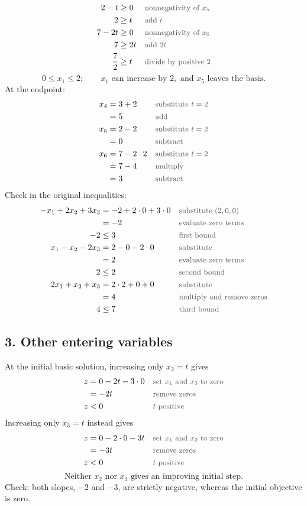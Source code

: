 \documentclass[a4paper,11pt]{article}
\newif\ifexplain
\newcommand{\teil}[1]{\subsection*{#1}}
\newcommand{\why}[1]{\text{\small\color{black!65}#1}}
\newcommand{\explain}[1]{\ifexplain\begin{erklbox}#1\end{erklbox}\fi}
\begin{document}
\begin{align*}
2-t&\geq0&&\why{nonnegativity of $x_5$}\\
2&\geq t&&\why{add $t$}\\
7-2t&\geq0&&\why{nonnegativity of $x_6$}\\
7&\geq2t&&\why{add $2t$}\\
\frac72&\geq t&&\why{divide by positive $2$}
\end{align*}
\[\boxed{0\leq x_1\leq2;\qquad x_1\text{ can increase by }2,\text{ and }x_5\text{ leaves the basis}.}\]
At the endpoint:
\begin{align*}
x_4&=3+2&&\why{substitute $t=2$}\\
&=5&&\why{add}\\
x_5&=2-2&&\why{substitute $t=2$}\\
&=0&&\why{subtract}\\
x_6&=7-2\cdot2&&\why{substitute $t=2$}\\
&=7-4&&\why{multiply}\\
&=3&&\why{subtract}
\end{align*}
Check in the original inequalities:
\begin{align*}
-x_1+2x_2+3x_3&=-2+2\cdot0+3\cdot0&&\why{substitute $(2,0,0)$}\\
&=-2&&\why{evaluate zero terms}\\
-2&\leq3&&\why{first bound}\\
x_1-x_2-2x_3&=2-0-2\cdot0&&\why{substitute}\\
&=2&&\why{evaluate zero terms}\\
2&\leq2&&\why{second bound}\\
2x_1+x_2+x_3&=2\cdot2+0+0&&\why{substitute}\\
&=4&&\why{multiply and remove zeros}\\
4&\leq7&&\why{third bound}
\end{align*}

\teil{3. Other entering variables}
At the initial basic solution, increasing only $x_2=t$ gives
\begin{align*}
z&=0-2t-3\cdot0&&\why{set $x_1$ and $x_3$ to zero}\\
&=-2t&&\why{remove zeros}\\
z&<0&&\why{$t$ positive}
\end{align*}
Increasing only $x_3=t$ instead gives
\begin{align*}
z&=0-2\cdot0-3t&&\why{set $x_1$ and $x_2$ to zero}\\
&=-3t&&\why{remove zeros}\\
z&<0&&\why{$t$ positive}
\end{align*}
\[\boxed{\text{Neither }x_2\text{ nor }x_3\text{ gives an improving initial step}.}\]
Check: both slopes, $-2$ and $-3$, are strictly negative, whereas the initial objective is zero.
\explain{Eine zulässige Bewegung ist noch keine Verbesserung. Beide Variablen könnten zunächst ein Stück wachsen, aber der Zielfunktionswert sinkt dabei. Für das Maximum wählen wir hier $x_1$ mit positivem Koeffizienten. Diese Aussage betrifft den einzelnen Schritt ab der Startlösung, nicht beliebige gleichzeitige Änderungen mehrerer Variablen.}
\end{document}
